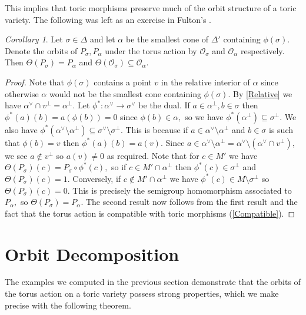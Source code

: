 \documentclass[BSc]{usydthesis}
\numberwithin{equation}{chapter}
\theoremstyle{remark}
\newtheorem{Corollary}[equation]{Corollary}
\newcommand{\V}{\vee}
\begin{document}
This implies that toric morphisms preserve much of the orbit structure of a toric variety. The following was left as an exercise in Fulton's \cite[Page.~ 56, \S 3.1]{Fulton:Toric}.
\begin{Corollary}
 Let $\sigma \in \Delta$ and let $\alpha$ be the smallest cone of $\Delta'$ containing $\phi(\sigma).$ Denote the orbits of $P_{\sigma}, P_{\alpha}$ under the torus action by $\mathcal{O}_{\sigma}$ and $\mathcal{O}_{\alpha}$ respectively. Then $\Theta(P_{\sigma}) = P_{\alpha}$ and $\Theta( \mathcal{O}_{\sigma} ) \subseteq \mathcal{O}_{\alpha}.$
\end{Corollary}
\begin{proof}
 Note that $\phi(\sigma)$ contains a point $v$ in the relative interior of $\alpha$ since otherwise $\alpha$ would not be the smallest cone containing $\phi(\sigma).$ By \ref{Relative} we have $\alpha^{\V} \cap v^{\perp} = \alpha^{\perp}.$ Let $\phi^*: \alpha^{\V} \to \sigma^{\V}$ be the dual. If $a\in \alpha^{\perp}, b\in \sigma$ then $\phi^*(a)(b) = a(\phi(b)) =0$ since $\phi(b)\in \alpha,$ so we have $\phi^*(\alpha^{\perp}) \subseteq \sigma^{\perp}.$ We also have $\phi^*(\alpha^{\V}\setminus \alpha^{\perp}) \subseteq \sigma^{\V}\setminus \sigma^{\perp}.$ This is because if $a\in \alpha^{\V}\setminus \alpha^{\perp}$ and $b\in \sigma$ is such that $\phi(b)=v$ then $\phi^*(a)(b) = a(v).$ Since $a\in \alpha^{\V}\setminus \alpha^{\perp} = \alpha^{\V}\setminus (\alpha^{\V} \cap v^{\perp}),$ we see $a\notin v^{\perp}$ so $a(v)\neq 0$ as required. Note that for $c\in M'$ we have $\Theta(P_{\sigma})(c) = P_{\sigma} \circ \phi^*(c),$ so if $c\in M' \cap \alpha^{\perp}$ then $\phi^*(c)\in \sigma^{\perp}$ and $\Theta(P_{\sigma})(c)=1.$ Conversely, if $c\notin M'\cap \alpha^{\perp}$ we have $\phi^*(c) \in M\setminus \sigma^{\perp}$ so $\Theta(P_{\sigma})(c)=0.$ This is precisely the semigroup homomorphism associated to $P_{\alpha},$ so $\Theta(P_{\sigma}) = P_{\alpha}.$ The second result now follows from the first result and the fact that the torus action is compatible with toric morphisms (\ref{Compatible}).
\end{proof}


\section{Orbit Decomposition}

The examples we computed in the previous section demonstrate that the orbits of the torus action on a toric variety possess strong properties, which we make precise with the following theorem.
\end{document}
